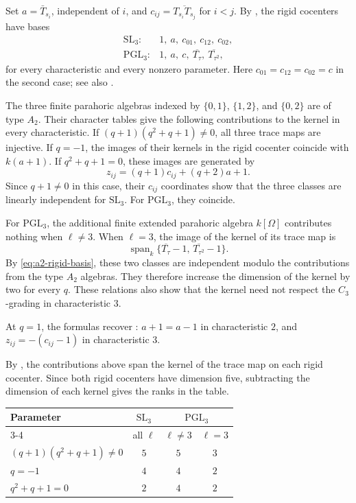 \documentclass[11pt,letterpaper]{amsart}
\theoremstyle{definition}
\numberwithin{equation}{section}
\numberwithin{theorem}{section}
\newcommand{\kk}{k}
\DeclareMathOperator{\spanop}{span}
\begin{document}
Set $a=\bar T_{s_i}$, independent of $i$, and
$c_{ij}=\overline{T_{s_i}T_{s_j}}$ for $i<j$.
By , the rigid
cocenters have bases
\begin{equation}\label{eq:a2-rigid-basis}
 \begin{array}{ll}
 \mathrm{SL}_3:&1,\ a,\ c_{01},\ c_{12},\ c_{02},\\
 \mathrm{PGL}_3:&1,\ a,\ c,\ \overline{T_\tau},\
                         \overline{T_{\tau^2}},
 \end{array}
\end{equation}
for every characteristic and every nonzero parameter.
Here $c_{01}=c_{12}=c_{02}=c$ in the second case;
see also \cite[Examples~3.14--3.15]{He16}.

The three finite parahoric algebras indexed by
$\{0,1\}$, $\{1,2\}$, and $\{0,2\}$ are of type $A_2$.
Their character tables
\cite[Example~3.5]{He16} give the following
contributions to the kernel in every characteristic.
If $(q+1)(q^2+q+1)\ne0$, all three trace maps
are injective.
If $q=-1$, the images of their kernels in the
rigid cocenter coincide with $\kk(a+1)$.
If $q^2+q+1=0$, these images are generated by
\[
 z_{ij}=(q+1)c_{ij}+(q+2)a+1.
\]
Since $q+1\ne0$ in this case, their $c_{ij}$
coordinates show that the three classes are
linearly independent for $\mathrm{SL}_3$.
For $\mathrm{PGL}_3$, they coincide.

For $\mathrm{PGL}_3$, the additional finite
extended parahoric algebra $\kk[\Omega]$ contributes
nothing when $\ell\ne3$.
When $\ell=3$, the image of the kernel of its
trace map is
\[
 \spanop_\kk\{
   \overline{T_\tau}-1,\,
   \overline{T_{\tau^2}}-1
 \}.
\]
By \eqref{eq:a2-rigid-basis}, these two classes
are independent modulo the contributions from
the type $A_2$ algebras.
They therefore increase the dimension of the
kernel by two for every $q$.
These relations also show that the kernel need
not respect the $C_3$-grading in characteristic $3$.

At $q=1$, the formulas recover
:
$a+1=a-1$ in characteristic $2$, and
$z_{ij}=-(c_{ij}-1)$ in characteristic $3$.

By , the contributions above span
the kernel of the trace map on each rigid cocenter.
Since both rigid cocenters have dimension five, subtracting
the dimension of each kernel gives the ranks in the table.

\begin{center}
\begin{tabular}{@{}lccc@{}}
\toprule
Parameter
 & $\mathrm{SL}_3$
 & \multicolumn{2}{c}{$\mathrm{PGL}_3$}\\
\cmidrule(l){3-4}
 & all $\ell$ & $\ell\ne3$ & $\ell=3$\\
\midrule
$(q+1)(q^2+q+1)\ne0$ & $5$ & $5$ & $3$\\
$q=-1$               & $4$ & $4$ & $2$\\
$q^2+q+1=0$          & $2$ & $4$ & $2$\\
\bottomrule
\end{tabular}
\end{center}
\end{document}
